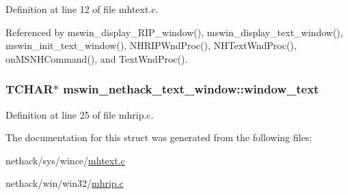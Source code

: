 Definition at line 12 of file mhtext.\+c.



Referenced by mswin\+\_\+display\+\_\+\+R\+I\+P\+\_\+window(), mswin\+\_\+display\+\_\+text\+\_\+window(), mswin\+\_\+init\+\_\+text\+\_\+window(), N\+H\+R\+I\+P\+Wnd\+Proc(), N\+H\+Text\+Wnd\+Proc(), on\+M\+S\+N\+H\+Command(), and Text\+Wnd\+Proc().

\hypertarget{structmswin__nethack__text__window_aadd9eebf8d5c2fd965c26ac77549f748}{
\subsubsection[{window\+\_\+text}]{\setlength{\rightskip}{0pt plus 5cm}T\+C\+H\+A\+R$\ast$ mswin\+\_\+nethack\+\_\+text\+\_\+window\+::window\+\_\+text}}\label{structmswin__nethack__text__window_aadd9eebf8d5c2fd965c26ac77549f748}


Definition at line 25 of file mhrip.\+c.



The documentation for this struct was generated from the following files\+:\begin{DoxyCompactItemize}
\item 
nethack/sys/wince/\hyperlink{sys_2wince_2mhtext_8c}{mhtext.\+c}\item 
nethack/win/win32/\hyperlink{win_2win32_2mhrip_8c}{mhrip.\+c}\end{DoxyCompactItemize}
